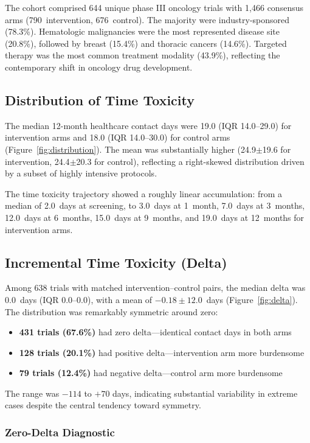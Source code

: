 \documentclass[11pt,a4paper]{article}
\begin{document}
The cohort comprised 644 unique phase III oncology trials with 1{,}466 consensus arms (790~intervention, 676~control). The majority were industry-sponsored (78.3\%). Hematologic malignancies were the most represented disease site (20.8\%), followed by breast (15.4\%) and thoracic cancers (14.6\%). Targeted therapy was the most common treatment modality (43.9\%), reflecting the contemporary shift in oncology drug development.

\subsection{Distribution of Time Toxicity}

The median 12-month healthcare contact days were 19.0 (IQR 14.0--29.0) for intervention arms and 18.0 (IQR 14.0--30.0) for control arms (Figure~\ref{fig:distribution}). The mean was substantially higher (24.9$\pm$19.6 for intervention, 24.4$\pm$20.3 for control), reflecting a right-skewed distribution driven by a subset of highly intensive protocols.

The time toxicity trajectory showed a roughly linear accumulation: from a median of 2.0~days at screening, to 3.0~days at 1~month, 7.0~days at 3~months, 12.0~days at 6~months, 15.0~days at 9~months, and 19.0~days at 12~months for intervention arms.

\subsection{Incremental Time Toxicity (Delta)}

Among 638 trials with matched intervention--control pairs, the median delta was 0.0~days (IQR 0.0--0.0), with a mean of $-0.18 \pm 12.0$~days (Figure~\ref{fig:delta}). The distribution was remarkably symmetric around zero:
\begin{itemize}
    \item \textbf{431 trials (67.6\%)} had zero delta---identical contact days in both arms
    \item \textbf{128 trials (20.1\%)} had positive delta---intervention arm more burdensome
    \item \textbf{79 trials (12.4\%)} had negative delta---control arm more burdensome
\end{itemize}
The range was $-114$ to $+70$ days, indicating substantial variability in extreme cases despite the central tendency toward symmetry.

\subsubsection{Zero-Delta Diagnostic}
\end{document}
